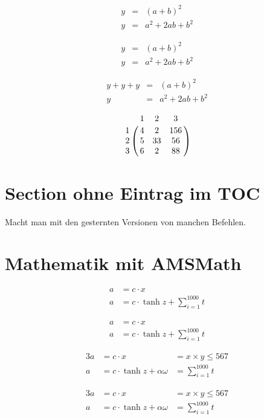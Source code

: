 \begin{eqnarray} %
y &=& (a + b)^2 \\
y &=& a^2 + 2ab +b^2
\end{eqnarray}

\begin{eqnarray*} %
y &=& (a + b)^2 \\
y &=& a^2 + 2ab +b^2 
\end{eqnarray*}

\blindtext

\[
\begin{array}{lcr}
y + y + y &=& (a + b)^2 \\
y &=& a^2 + 2ab +b^2 
\end{array}
\]

\[ %
\bordermatrix{
   & 1 & 2 & 3 \cr
1 & 4 & 2 & 156 \cr
2 & 5 & 33 & 56 \cr
3 & 6 & 2 & 88 \cr
}
\]

\section*{Section ohne Eintrag im TOC}

Macht man mit den gesternten Versionen von manchen Befehlen.

\section{Mathematik mit AMSMath}

\begin{align} %
a &= c \cdot x \\
a &= c \cdot \tanh z + \sum_{i=1}^{1000} t
\end{align}

\begin{align*} %
a &= c \cdot x \\
a &= c \cdot \tanh z + \sum_{i=1}^{1000} t
\end{align*}

\begin{alignat}{3}
a &= c \cdot x &= x\times y \leq 567 \\
a &= c \cdot \tanh z + \alpha\omega &= \sum_{i=1}^{1000} t
\end{alignat}

\begin{alignat*}{3}
a &= c \cdot x &= x\times y \leq 567 \\
a &= c \cdot \tanh z + \alpha\omega &= \sum_{i=1}^{1000} t
\end{alignat*}

